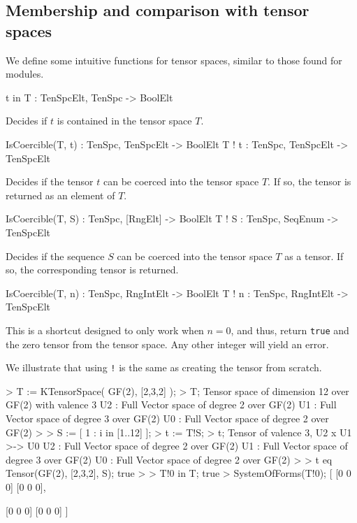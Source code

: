 \subsection{Membership and comparison with tensor spaces}

We define some intuitive functions for tensor spaces, similar to those found for modules.

\begin{intrinsics}
t in T : TenSpcElt, TenSpc -> BoolElt
\end{intrinsics}

Decides if $t$ is contained in the tensor space $T$.

\begin{intrinsics}
IsCoercible(T, t) : TenSpc, TenSpcElt -> BoolElt
T ! t : TenSpc, TenSpcElt -> TenSpcElt
\end{intrinsics}

Decides if the tensor $t$ can be coerced into the tensor space $T$. If so, the tensor is returned as an element of $T$.

\begin{intrinsics}
IsCoercible(T, S) : TenSpc, [RngElt] -> BoolElt
T ! S : TenSpc, SeqEnum -> TenSpcElt
\end{intrinsics}

Decides if the sequence $S$ can be coerced into the tensor space $T$ as a tensor. If so, the corresponding tensor is returned. 

\begin{intrinsics}
IsCoercible(T, n) : TenSpc, RngIntElt -> BoolElt
T ! n : TenSpc, RngIntElt -> TenSpcElt
\end{intrinsics}

This is a shortcut designed to only work when $n=0$, and thus, return {\tt true} and the zero tensor from the tensor space. 
Any other integer will yield an error.

\begin{example}[Coercion]
We illustrate that using \texttt{!} is the same as creating the tensor from scratch.

\begin{code}
> T := KTensorSpace( GF(2), [2,3,2] );
> T;
Tensor space of dimension 12 over GF(2) with valence 3
U2 : Full Vector space of degree 2 over GF(2)
U1 : Full Vector space of degree 3 over GF(2)
U0 : Full Vector space of degree 2 over GF(2)
> 
> S := [ 1 : i in [1..12] ];
> t := T!S;
> t;
Tensor of valence 3, U2 x U1 >-> U0
U2 : Full Vector space of degree 2 over GF(2)
U1 : Full Vector space of degree 3 over GF(2)
U0 : Full Vector space of degree 2 over GF(2)
> 
> t eq Tensor(GF(2), [2,3,2], S);
true
> 
> T!0 in T;
true
> SystemOfForms(T!0);
[
    [0 0 0]
    [0 0 0],

    [0 0 0]
    [0 0 0]
]
\end{code}

\end{example}

